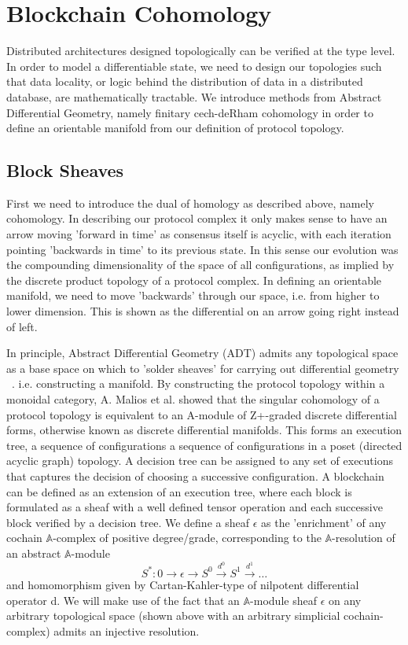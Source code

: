 \documentclass[runningheads]{llncs}
\begin{document}
\section{Blockchain Cohomology}
Distributed architectures designed topologically can be verified at the type level. In order to model a differentiable state, we need to design our topologies such that data locality, or logic behind the distribution of data in a distributed database, are mathematically tractable. We introduce methods from Abstract Differential Geometry, namely finitary cech-deRham cohomology in order to define an orientable manifold from our definition of protocol topology.

\subsection{Block Sheaves}
First we need to introduce the dual of homology as described above, namely cohomology. In describing our protocol complex it only makes sense to have an arrow moving 'forward in time' as consensus itself is acyclic, with each iteration pointing 'backwards in time' to its previous state. In this sense our evolution was the compounding dimensionality of the space of all configurations, as implied by the discrete product topology of a protocol complex. In defining an orientable manifold, we need to move 'backwards' through our space, i.e. from higher to lower dimension. This is shown as the differential on an arrow going right instead of left. 

In principle, Abstract Differential Geometry (ADT) admits any topological space as a base space on which to 'solder sheaves' for carrying out differential geometry ~\cite{ref_article6}. i.e. constructing a manifold. By constructing the protocol topology within a monoidal category, A. Malios et al. showed that the singular cohomology of a protocol topology is equivalent to an A-module of Z+-graded discrete differential forms, otherwise known as discrete differential manifolds. This forms an execution tree, a sequence of configurations a sequence of configurations in a poset (directed acyclic graph) topology. A decision tree can be assigned to any set of executions that captures the decision of choosing a successive configuration. A blockchain can be defined as an extension of an execution tree, where each block is formulated as a sheaf with a well defined tensor operation and each successive block verified by a decision tree. We define a sheaf $\epsilon$ as the 'enrichment' of any cochain $\mathbb{A}$-complex of positive degree/grade, corresponding to the $\mathbb{A}$-resolution of an abstract $\mathbb{A}$-module
\begin{equation}
S^*: 0 \rightarrow \epsilon \rightarrow S^0 \xrightarrow{d^0} S^1 \xrightarrow{d^1} \dots
\end{equation}
and homomorphism given by Cartan-Kahler-type of nilpotent differential operator d. We will make use of the fact that an $\mathbb{A}$-module sheaf $\epsilon$ on any arbitrary topological space (shown above with an arbitrary simplicial cochain-complex) admits an injective resolution.
\end{document}
